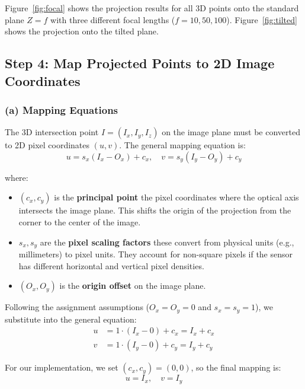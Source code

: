\documentclass[12pt]{article}
\begin{document}
Figure~\ref{fig:focal} shows the projection results for all 3D points onto the standard plane $Z = f$ with three different focal lengths ($f = 10, 50, 100$). Figure~\ref{fig:tilted} shows the projection onto the tilted plane.

\subsection*{Step 4: Map Projected Points to 2D Image Coordinates}

\subsubsection*{(a) Mapping Equations}

The 3D intersection point $I = (I_x, I_y, I_z)$ on the image plane must be converted to 2D pixel coordinates $(u, v)$. The general mapping equation is:
\begin{equation}
    u = s_x(I_x - O_x) + c_x, \quad v = s_y(I_y - O_y) + c_y
\end{equation}

where:
\begin{itemize}
    \item $(c_x, c_y)$ is the \textbf{principal point}    the pixel coordinates where the optical axis intersects the image plane. This shifts the origin of the projection from the corner to the center of the image.
    \item $s_x, s_y$ are the \textbf{pixel scaling factors}    these convert from physical units (e.g., millimeters) to pixel units. They account for non-square pixels if the sensor has different horizontal and vertical pixel densities.
    \item $(O_x, O_y)$ is the \textbf{origin offset} on the image plane.
\end{itemize}

Following the assignment assumptions ($O_x = O_y = 0$ and $s_x = s_y = 1$), we substitute into the general equation:
\begin{align}
    u &= 1 \cdot (I_x - 0) + c_x = I_x + c_x \\
    v &= 1 \cdot (I_y - 0) + c_y = I_y + c_y
\end{align}

For our implementation, we set $(c_x, c_y) = (0, 0)$, so the final mapping is:
\begin{equation}
    u = I_x, \quad v = I_y
\end{equation}
\end{document}
